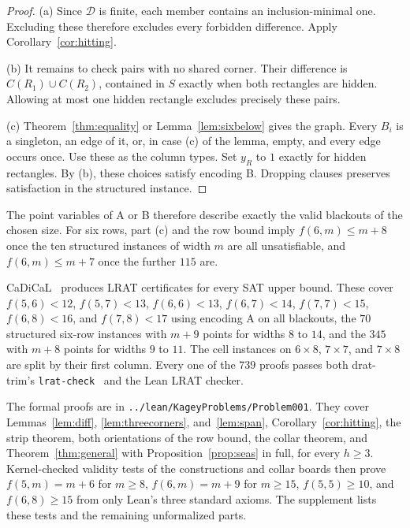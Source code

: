 \documentclass[12pt]{article}
\theoremstyle{plain}
\theoremstyle{definition}
\theoremstyle{remark}
\begin{document}
\begin{proof}
(a) Since $\mathcal D$ is finite, each member contains an inclusion-minimal
one. Excluding these therefore excludes every forbidden difference.
Apply Corollary~\ref{cor:hitting}.

(b) It remains to check pairs with no shared corner. Their difference is
$C(R_1)\cup C(R_2)$, contained in $S$ exactly when both rectangles are
hidden. Allowing at most one hidden rectangle excludes precisely these pairs.

(c) Theorem~\ref{thm:equality} or Lemma~\ref{lem:sixbelow} gives the graph.
Every $B_i$ is a singleton, an edge of it, or, in case (c) of the lemma, empty, and every
edge occurs once. Use these as the column types. Set $y_R$ to $1$ exactly
for hidden rectangles. By (b), these choices satisfy encoding B.
Dropping clauses preserves satisfaction in the structured instance.
\end{proof}

The point variables of A or B therefore describe exactly the valid
blackouts of the chosen size. For six rows, part (c) and the
row bound imply $f(6,m)\le m+8$ once the ten structured instances of
width $m$ are all unsatisfiable, and $f(6,m)\le m+7$ once the further $115$ are.

CaDiCaL~\cite{biere2024} produces LRAT certificates for every SAT upper bound.
These cover
$f(5,6)<12$, $f(5,7)<13$, $f(6,6)<13$, $f(6,7)<14$, $f(7,7)<15$,
$f(6,8)<16$, and $f(7,8)<17$ using encoding A on all blackouts, the $70$ structured six-row
instances with $m+9$ points for widths $8$ to $14$, and the $345$ with $m+8$ points for
widths $9$ to $11$. The cell instances on $6\times8$, $7\times7$, and $7\times8$ are split by
their first column. Every one of the $739$ proofs passes both drat-trim's
\texttt{lrat-check}~\cite{cruzfilipe2017,wetzler2014} and the Lean LRAT checker.

The formal proofs are in \nolinkurl{../lean/KageyProblems/Problem001}.
They cover Lemmas~\ref{lem:diff}, \ref{lem:threecorners}, and~\ref{lem:span},
Corollary~\ref{cor:hitting}, the strip theorem, both orientations of
the row bound, the collar theorem, and Theorem~\ref{thm:general} with
Proposition~\ref{prop:seas} in full, for every $h\ge3$. Kernel-checked validity tests of the constructions
and collar boards then prove $f(5,m)=m+6$ for $m\ge8$, $f(6,m)=m+9$ for
$m\ge15$, $f(5,5)\ge10$, and $f(6,8)\ge15$ from only Lean's three
standard axioms. The supplement lists these tests and the remaining unformalized parts.
\end{document}
